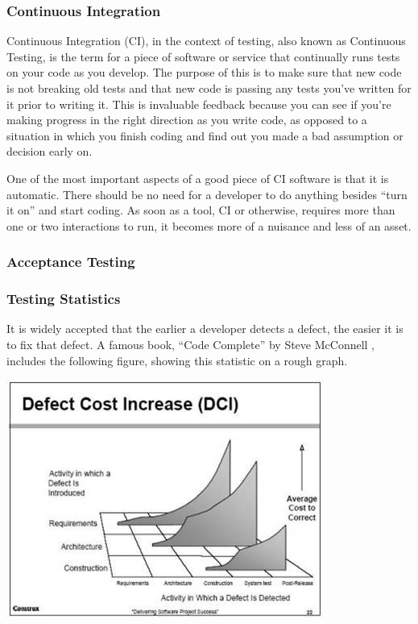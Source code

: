 \documentclass[11pt]{article}
\newenvironment{Figure}
  {\par\medskip\noindent\minipage{\linewidth}}
  {\endminipage\par\medskip}
\begin{document}
\subsubsection{Continuous Integration}
Continuous Integration (CI), in the context of testing, also known as Continuous Testing, is the term for a piece of software or service that continually runs tests on your code as you develop. The purpose of this is to make sure that new code is not breaking old tests and that new code is passing any tests you've written for it prior to writing it. This is invaluable feedback because you can see if you're making progress in the right direction as you write code, as opposed to a situation in which you finish coding and find out you made a bad assumption or decision early on. 

One of the most important aspects of a good piece of CI software is that it is automatic. There should be no need for a developer to do anything besides ``turn it on'' and start coding. As soon as a tool, CI or otherwise, requires more than one or two interactions to run, it becomes more of a nuisance and less of an asset.

\subsubsection{Acceptance Testing}

\subsubsection{Testing Statistics}
It is widely accepted that the earlier a developer detects a defect, the easier it is to fix that defect. A famous book, ``Code Complete'' by Steve McConnell \cite{DefectPic}, includes the following figure, showing this statistic on a rough graph.

\begin{Figure}
	\centering
	\includegraphics[width=0.8\linewidth]{defectcost.jpg} 
\end{Figure}
\end{document}
